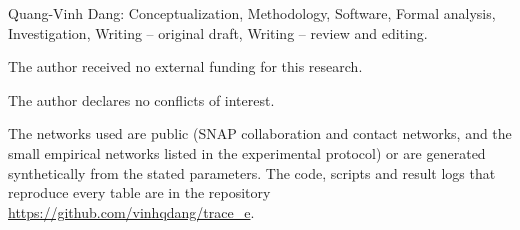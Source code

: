 \documentclass[ASNA,number]{USG}
\begin{document}
\setlength{\bibsep}{0pt}

Quang-Vinh Dang: Conceptualization, Methodology, Software, Formal analysis, Investigation, Writing -- original draft, Writing -- review and editing.

The author received no external funding for this research.

The author declares no conflicts of interest.

The networks used are public (SNAP collaboration and contact networks, and the small empirical networks listed in the experimental protocol) or are generated synthetically from the stated parameters. The code, scripts and result logs that reproduce every table are in the repository \url{https://github.com/vinhqdang/trace_e}.
\end{document}
